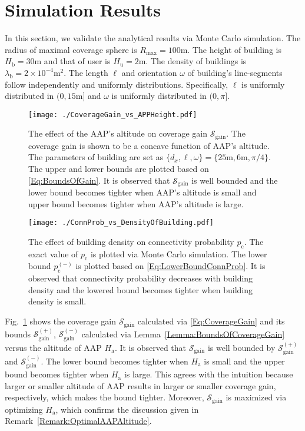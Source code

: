 \documentclass[12pt, draftclsnofoot, onecolumn]{IEEEtran}
\begin{document}
\section{Simulation Results}
In this section, we validate the analytical results via Monte Carlo simulation.  The radius of maximal coverage sphere is $R_{\mathrm{max}} = 100\mathrm{m}$. The height of building is $H_\mathrm{b} = 30\mathrm{m}$ and that of user is $H_{\textrm{u}} = 2\mathrm{m}$. The density of buildings is $\lambda_\mathrm{b} = 2\times 10^{-4} \mathrm{m}^2$. The length $\ell$ and orientation $\omega$ of building's line-segments follow  independently
and uniformly distributions. Specifically, $\ell$ is uniformly distributed in $(0, 15\mathrm{m}]$ and $\omega$ is uniformly distributed in $(0, \pi]$.


\begin{figure}[t]
\centering
\texttt{[image: ./CoverageGain\_vs\_APPHeight.pdf]}
\caption{The effect of the AAP's altitude on coverage gain $\mathcal{S}_{\mathrm{gain}}$. The coverage gain is shown to be a concave function of AAP's altitude. The parameters of building are set as $\{d_x, \ell, \omega\} = \{25\mathrm{m}, 6\mathrm{m}, \pi/4\}$. The upper and lower bounds are plotted based on \eqref{Eq:BoundsOfGain}. It is observed that $\mathcal{S}_{\mathrm{gain}}$ is well bounded and the lower bound becomes tighter when AAP's altitude is small and upper bound becomes tighter when AAP's altitude is large.}\label{CoverageGain}
\end{figure}

\begin{figure}[t]
\centering
\texttt{[image: ./ConnProb\_vs\_DensityOfBuilding.pdf]}
\caption{The effect of building density on connectivity probability $p_\mathrm{c}$. The exact value of $p_\mathrm{c}$ is plotted via Monte Carlo simulation. The lower bound $p_\mathrm{c}^{(-)}$ is plotted based on \eqref{Eq:LowerBoundConnProb}. It is observed that connectivity probability decreases with building density and the lowered bound becomes tighter when building density is small.}\label{ConnectivityProb}
\end{figure}

Fig.~\ref{CoverageGain} shows the  coverage gain $\mathcal{S}_{\mathrm{gain}}$ calculated via \eqref{Eq:CoverageGain} and its bounds $\mathcal{S}_{\mathrm{gain}}^{(+)}$, $\mathcal{S}_{\mathrm{gain}}^{(-)}$ calculated via Lemma~\ref{Lemma:BoundsOfCoverageGain} versus the altitude of AAP $H_\mathrm{a}$. It is observed that $\mathcal{S}_{\mathrm{gain}}$ is well bounded by $\mathcal{S}_{\mathrm{gain}}^{(+)}$ and $\mathcal{S}_{\mathrm{gain}}^{(-)}$.  The lower bound becomes tighter when $H_\mathrm{a}$ is small and the upper bound becomes tighter when $H_\mathrm{a}$ is large. This agrees with the intuition because larger or smaller altitude of AAP results in larger or smaller coverage gain, respectively, which makes the bound tighter. Moreover, $\mathcal{S}_{\mathrm{gain}}$ is maximized via optimizing $H_\mathrm{a}$, which confirms the discussion given in Remark~\ref{Remark:OptimalAAPAltitude}.
\end{document}
